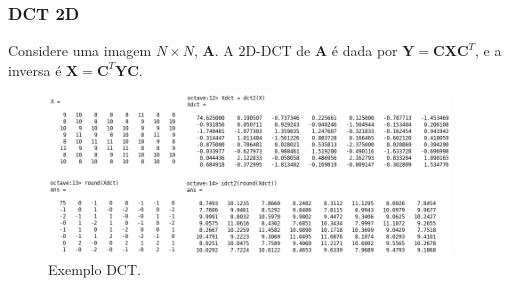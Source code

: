 \begin{frame}[allowframebreaks]
  \frametitle{DCT 2D}

  Considere uma imagem $N \times N$, $\mathbf{A}$.
  A 2D-DCT de $\mathbf{A}$ é dada por $\mathbf{Y} = \mathbf{C} \mathbf{X} \mathbf{C}^T$, e a
  inversa é $\mathbf{X} = \mathbf{C}^T \mathbf{Y} \mathbf{C}$.

  \framebreak

    \begin{figure}[ht]
    \centering
    \includegraphics[width=0.95\textwidth]{images/ex-num-dct.png}
    \caption{Exemplo DCT.}
    \label{fig:dct_2d_ex}
    \end{figure}

\end{frame}



